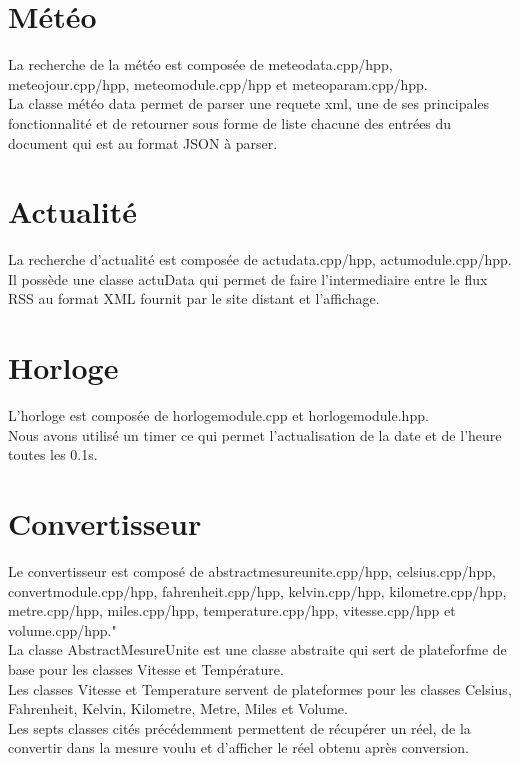 \documentclass[12pt]{report}
\begin{document}
    \section{Météo}
      La recherche de la météo est composée de meteodata.cpp/hpp, meteojour.cpp/hpp, meteomodule.cpp/hpp et meteoparam.cpp/hpp.\\
      La classe météo data permet de parser une requete xml, une de ses principales fonctionnalité et de retourner sous forme de liste chacune des entrées du document qui est au format JSON à parser.
    \section{Actualité}
      La recherche d'actualité est composée de actudata.cpp/hpp, actumodule.cpp/hpp.\\
      Il possède une classe actuData qui permet de faire l'intermediaire entre le flux RSS au format XML fournit par le site distant et l'affichage.
    \section{Horloge}
      L'horloge est composée de horlogemodule.cpp et horlogemodule.hpp.\\
      Nous avons utilisé un timer ce qui permet l'actualisation de la date et de l'heure toutes les 0.1s.\\
    \section{Convertisseur}
      Le convertisseur est composé de abstractmesureunite.cpp/hpp, celsius.cpp/hpp, convertmodule.cpp/hpp, fahrenheit.cpp/hpp, kelvin.cpp/hpp, kilometre.cpp/hpp, metre.cpp/hpp, miles.cpp/hpp, temperature.cpp/hpp, vitesse.cpp/hpp et volume.cpp/hpp."\\
      La classe AbstractMesureUnite est une classe abstraite qui sert de plateforfme de base pour les classes Vitesse et Température.\\
      Les classes Vitesse et Temperature servent de plateformes pour les classes Celsius, Fahrenheit, Kelvin, Kilometre, Metre, Miles et Volume.\\
      Les septs classes cités précédemment permettent de récupérer un réel, de la convertir dans la mesure voulu et d'afficher le réel obtenu après conversion.
\end{document}

